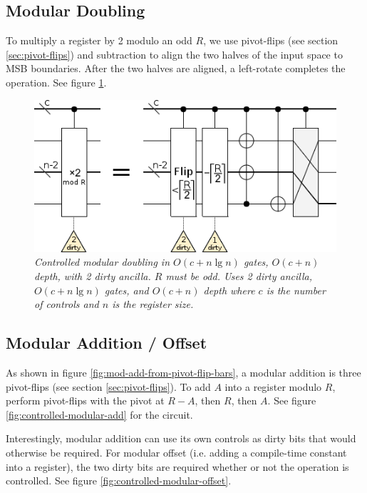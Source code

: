 \documentclass[twocolumn]{article}
\begin{document}
\subsection{Modular Doubling}

To multiply a register by 2 modulo an odd $R$, we use pivot-flips (see section \ref{sec:pivot-flips}) and subtraction to align the two halves of the input space to MSB boundaries.
After the two halves are aligned, a left-rotate completes the operation.
See figure \ref{fig:modular-double}.

\begin{figure}
  \centering
  \includegraphics[width=\linewidth]{assets/controlled-modular-double.png}
  \caption{\em
    Controlled modular doubling in $O(c + n \lg n)$ gates, $O(c + n)$ depth, with 2 dirty ancilla.
    $R$ must be odd.
    Uses 2 dirty ancilla, $O(c + n \lg n)$ gates, and $O(c + n)$ depth where $c$ is the number of controls and $n$ is the register size.
  }
  \label{fig:modular-double}
\end{figure}


\subsection{Modular Addition / Offset}

As shown in figure \ref{fig:mod-add-from-pivot-flip-bars}, a modular addition is three pivot-flips (see section \ref{sec:pivot-flips}).
To add $A$ into a register modulo $R$, perform pivot-flips with the pivot at $R-A$, then $R$, then $A$.
See figure \ref{fig:controlled-modular-add} for the circuit.

Interestingly, modular addition can use its own controls as dirty bits that would otherwise be required.
For modular offset (i.e. adding a compile-time constant into a register), the two dirty bits are required whether or not the operation is controlled.
See figure \ref{fig:controlled-modular-offset}.
\end{document}
